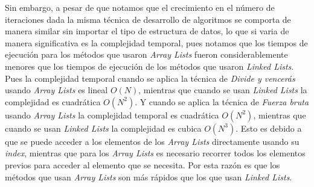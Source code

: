 Sin embargo, a pesar de que notamos que el crecimiento en el número de iteraciones dada la misma técnica de desarrollo de algoritmos se comporta de manera similar sin importar el tipo de estructura de datos, lo que si varia de manera significativa es la complejidad temporal, pues notamos que los tiempos de ejecución para los métodos que usaron \textit{Array Lists} fueron considerablemente menores que los tiempos de ejecución de los métodos que usaron \textit{Linked Lists}. Pues la complejidad temporal cuando se aplica la técnica de \textit{Divide y vencerás} usando \textit{Array Lists} es lineal $O(N)$, mientras que cuando se usan \textit{Linked Lists} la complejidad es cuadrática $O(N^2)$. Y cuando se aplica la técnica de \textit{Fuerza bruta} usando \textit{Array Lists} la complejidad temporal es cuadrática $O(N^2)$, mientras que cuando se usan \textit{Linked Lists} la complejidad es cubica $O(N^3)$. Esto es debido a que se puede acceder a los elementos de los \textit{Array Lists} directamente usando su \textit{index}, mientras que para los \textit{Array Lists} es necesario recorrer todos los elementos previos para acceder al elemento que se necesita. Por esta razón es que los métodos que usan \textit{Array Lists} son más rápidos que los que usan \textit{Linked Lists}.
